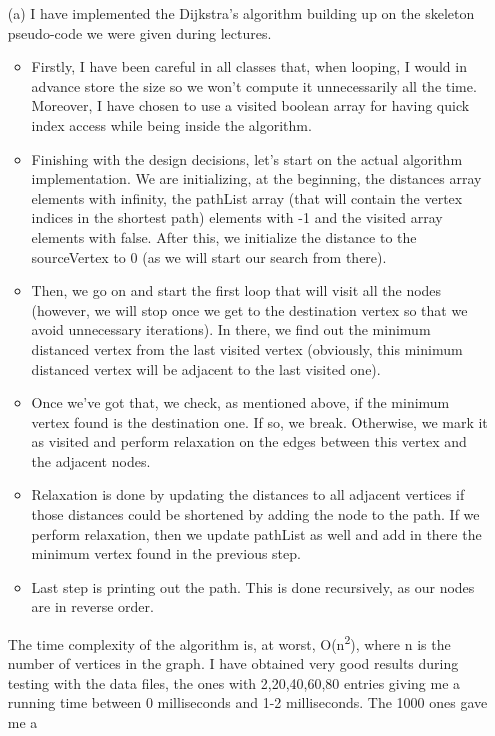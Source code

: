 \documentclass{article}
\begin{document}
\begin{itemize}
\item[(a)] 
I have implemented the Dijkstra's algorithm building up on the
skeleton pseudo-code we were given during lectures. 
\begin{itemize}
  \item Firstly, I have been careful in all classes that, when
    looping, I would in advance store the size so we won't compute it
    unnecessarily all the time. Moreover, I have chosen to use a
    visited boolean array for having quick index access while
    being inside the algorithm.
  \item Finishing with the design decisions, let's start on the actual
    algorithm implementation. We are initializing, at the beginning,
    the distances array elements with infinity, the pathList
    array (that will contain the vertex indices in the shortest path)
    elements with -1 and the visited array elements with
    false. After this, we initialize the distance to the
    sourceVertex to 0 (as we will start our search from there).
  \item Then, we go on and start the first loop that will visit all
    the nodes (however, we will stop once we get to the destination
    vertex so that we avoid unnecessary iterations).
    In there, we find out the minimum distanced vertex from 
    the last visited vertex (obviously, this minimum distanced vertex
    will be adjacent to the last visited one). 
  \item Once we've got that, we check, as mentioned above, if the
    minimum vertex found is the destination one. If so, we
    break. Otherwise, we mark it as visited and perform relaxation on
    the edges between this vertex and the adjacent nodes.
  \item Relaxation is done by updating the distances to all adjacent
    vertices if those distances could be shortened by adding the node
    to the path. If we perform relaxation, then we update
    pathList as well and add in there the minimum vertex found in the
    previous step.
  \item Last step is printing out the path. This is done recursively,
    as our nodes are in reverse order.
\end{itemize}
The time complexity of the algorithm is, at worst,
O(n\textsuperscript{2}), where n is the number of vertices in the
graph. I have obtained very good results during testing with the data
files, the ones with 2,20,40,60,80 entries giving me a running time
between 0 milliseconds and 1-2 milliseconds. The 1000 ones gave me a

\end{itemize}
\end{document}
